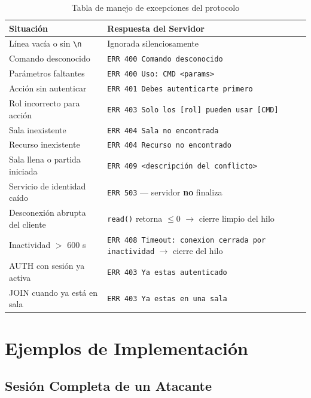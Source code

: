 \documentclass[12pt, letterpaper]{article}
\begin{document}
\begin{table}[H]
\centering
\begin{tabularx}{\textwidth}{X X}
\toprule
\textbf{Situación} & \textbf{Respuesta del Servidor} \\
\midrule
Línea vacía o sin \texttt{\textbackslash{}n} & Ignorada silenciosamente \\
Comando desconocido & \texttt{ERR 400 Comando desconocido} \\
Parámetros faltantes & \texttt{ERR 400 Uso: CMD <params>} \\
Acción sin autenticar & \texttt{ERR 401 Debes autenticarte primero} \\
Rol incorrecto para acción & \texttt{ERR 403 Solo los [rol] pueden usar [CMD]} \\
Sala inexistente & \texttt{ERR 404 Sala no encontrada} \\
Recurso inexistente & \texttt{ERR 404 Recurso no encontrado} \\
Sala llena o partida iniciada & \texttt{ERR 409 <descripción del conflicto>} \\
Servicio de identidad caído & \texttt{ERR 503} --- servidor \textbf{no} finaliza \\
Desconexión abrupta del cliente & \texttt{read()} retorna $\leq 0$ $\rightarrow$ cierre limpio del hilo \\
Inactividad $>$ 600 s & \texttt{ERR 408 Timeout: conexion cerrada por inactividad} $\rightarrow$ cierre del hilo \\
AUTH con sesión ya activa & \texttt{ERR 403 Ya estas autenticado} \\
JOIN cuando ya está en sala & \texttt{ERR 403 Ya estas en una sala} \\
\bottomrule
\end{tabularx}
\caption{Tabla de manejo de excepciones del protocolo}
\end{table}

\section{Ejemplos de Implementación}

\subsection{Sesión Completa de un Atacante}
\end{document}

